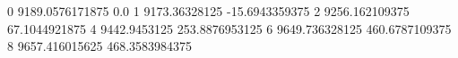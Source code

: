 0 9189.0576171875 0.0
1 9173.36328125 -15.6943359375
2 9256.162109375 67.1044921875
4 9442.9453125 253.8876953125
6 9649.736328125 460.6787109375
8 9657.416015625 468.3583984375
